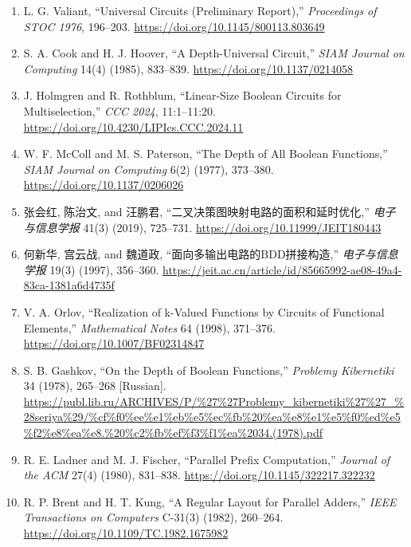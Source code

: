 \documentclass[
  11pt,
]{article}
\theoremstyle{definition}
\theoremstyle{remark}
\begin{document}
\begin{enumerate}
  dual-rail ternary encoding discussion.
  \url{https://loonwerks.com/publications/pdf/backes2013phd.pdf}
\item
  L. G. Valiant, ``Universal Circuits (Preliminary Report),''
  \emph{Proceedings of STOC 1976}, 196--203.
  \url{https://doi.org/10.1145/800113.803649}
\item
  S. A. Cook and H. J. Hoover, ``A Depth-Universal Circuit,'' \emph{SIAM
  Journal on Computing} 14(4) (1985), 833--839.
  \url{https://doi.org/10.1137/0214058}
\item
  J. Holmgren and R. Rothblum, ``Linear-Size Boolean Circuits for
  Multiselection,'' \emph{CCC 2024}, 11:1--11:20.
  \url{https://doi.org/10.4230/LIPIcs.CCC.2024.11}
\item
  W. F. McColl and M. S. Paterson, ``The Depth of All Boolean
  Functions,'' \emph{SIAM Journal on Computing} 6(2) (1977), 373--380.
  \url{https://doi.org/10.1137/0206026}
\item
  张会红, 陈治文, and 汪鹏君, ``二叉决策图映射电路的面积和延时优化,''
  \emph{电子与信息学报} 41(3) (2019), 725--731.
  \url{https://doi.org/10.11999/JEIT180443}
\item
  何新华, 宫云战, and 魏道政, ``面向多输出电路的BDD拼接构造,''
  \emph{电子与信息学报} 19(3) (1997), 356--360.
  \url{https://jeit.ac.cn/article/id/85665992-ae08-49a4-83ca-1381a6d4735f}
\item
  V. A. Orlov, ``Realization of k-Valued Functions by Circuits of
  Functional Elements,'' \emph{Mathematical Notes} 64 (1998), 371--376.
  \url{https://doi.org/10.1007/BF02314847}
\item
  S. B. Gashkov, ``On the Depth of Boolean Functions,'' \emph{Problemy
  Kibernetiki} 34 (1978), 265--268 {[}Russian{]}.
  \url{https://publ.lib.ru/ARCHIVES/P/\%27\%27Problemy_kibernetiki\%27\%27_\%28seriya\%29/\%cf\%f0\%ee\%e1\%eb\%e5\%ec\%fb\%20\%ea\%e8\%e1\%e5\%f0\%ed\%e5\%f2\%e8\%ea\%e8.\%20\%c2\%fb\%ef\%f3\%f1\%ea\%2034.(1978).pdf}
\item
  R. E. Ladner and M. J. Fischer, ``Parallel Prefix Computation,''
  \emph{Journal of the ACM} 27(4) (1980), 831--838.
  \url{https://doi.org/10.1145/322217.322232}
\item
  R. P. Brent and H. T. Kung, ``A Regular Layout for Parallel Adders,''
  \emph{IEEE Transactions on Computers} C-31(3) (1982), 260--264.
  \url{https://doi.org/10.1109/TC.1982.1675982}
\end{enumerate}
\end{document}
